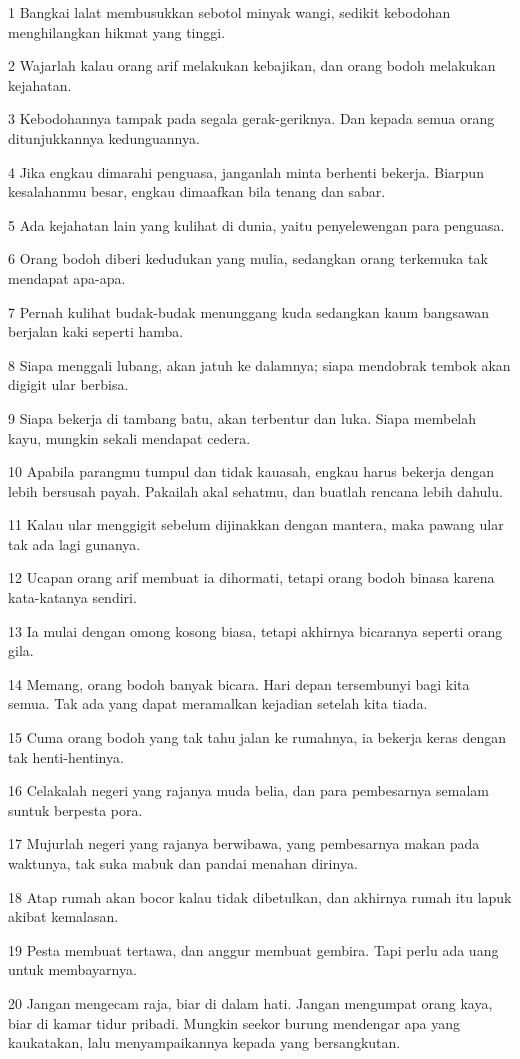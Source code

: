 \par 1 Bangkai lalat membusukkan sebotol minyak wangi, sedikit kebodohan menghilangkan hikmat yang tinggi.
\par 2 Wajarlah kalau orang arif melakukan kebajikan, dan orang bodoh melakukan kejahatan.
\par 3 Kebodohannya tampak pada segala gerak-geriknya. Dan kepada semua orang ditunjukkannya kedunguannya.
\par 4 Jika engkau dimarahi penguasa, janganlah minta berhenti bekerja. Biarpun kesalahanmu besar, engkau dimaafkan bila tenang dan sabar.
\par 5 Ada kejahatan lain yang kulihat di dunia, yaitu penyelewengan para penguasa.
\par 6 Orang bodoh diberi kedudukan yang mulia, sedangkan orang terkemuka tak mendapat apa-apa.
\par 7 Pernah kulihat budak-budak menunggang kuda sedangkan kaum bangsawan berjalan kaki seperti hamba.
\par 8 Siapa menggali lubang, akan jatuh ke dalamnya; siapa mendobrak tembok akan digigit ular berbisa.
\par 9 Siapa bekerja di tambang batu, akan terbentur dan luka. Siapa membelah kayu, mungkin sekali mendapat cedera.
\par 10 Apabila parangmu tumpul dan tidak kauasah, engkau harus bekerja dengan lebih bersusah payah. Pakailah akal sehatmu, dan buatlah rencana lebih dahulu.
\par 11 Kalau ular menggigit sebelum dijinakkan dengan mantera, maka pawang ular tak ada lagi gunanya.
\par 12 Ucapan orang arif membuat ia dihormati, tetapi orang bodoh binasa karena kata-katanya sendiri.
\par 13 Ia mulai dengan omong kosong biasa, tetapi akhirnya bicaranya seperti orang gila.
\par 14 Memang, orang bodoh banyak bicara. Hari depan tersembunyi bagi kita semua. Tak ada yang dapat meramalkan kejadian setelah kita tiada.
\par 15 Cuma orang bodoh yang tak tahu jalan ke rumahnya, ia bekerja keras dengan tak henti-hentinya.
\par 16 Celakalah negeri yang rajanya muda belia, dan para pembesarnya semalam suntuk berpesta pora.
\par 17 Mujurlah negeri yang rajanya berwibawa, yang pembesarnya makan pada waktunya, tak suka mabuk dan pandai menahan dirinya.
\par 18 Atap rumah akan bocor kalau tidak dibetulkan, dan akhirnya rumah itu lapuk akibat kemalasan.
\par 19 Pesta membuat tertawa, dan anggur membuat gembira. Tapi perlu ada uang untuk membayarnya.
\par 20 Jangan mengecam raja, biar di dalam hati. Jangan mengumpat orang kaya, biar di kamar tidur pribadi. Mungkin seekor burung mendengar apa yang kaukatakan, lalu menyampaikannya kepada yang bersangkutan.

